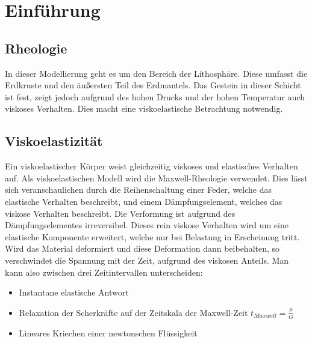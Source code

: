\documentclass[12pt]{article}
\begin{document}
\newpage

\section{Einführung}

\subsection{Rheologie}
In dieser Modellierung geht es um den Bereich der Lithosphäre. Diese umfasst die Erdkruste und den äußersten Teil des Erdmantels. Das Gestein in dieser Schicht ist fest, zeigt jedoch aufgrund des hohen Drucks und der hohen Temperatur auch viskoses Verhalten. Dies macht eine viskoelastische Betrachtung notwendig.


\subsection{Viskoelastizität}
Ein viskoelastischer Körper weist gleichzeitig viskoses und elastisches Verhalten auf. Als viskoelastischen Modell wird die Maxwell-Rheologie verwendet. Dies lässt sich veranschaulichen durch die Reihenschaltung einer Feder, welche das elastische Verhalten beschreibt, und einem Dämpfungselement, welches das viskose Verhalten beschreibt. Die Verformung ist aufgrund des Dämpfungselementes irreversibel. Dieses rein viskose Verhalten wird um eine elastische Komponente erweitert, welche nur bei Belastung in Erscheinung tritt. Wird das Material deformiert und diese Deformation dann beibehalten, so verschwindet die Spannung mit der Zeit, aufgrund des viskosen Anteils. Man kann also zwischen drei Zeitintervallen unterscheiden:
\begin{itemize}
	\item Instantane elastische Antwort
	\item Relaxation der Scherkräfte auf der Zeitskala der Maxwell-Zeit $t_{Maxwell} = \frac{\mu}{G}$
	\item Lineares Kriechen einer newtonschen Flüssigkeit
\end{itemize}
\end{document}
